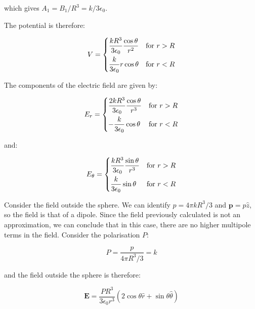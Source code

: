 \documentclass[12pt]{article}
\begin{document}
which gives $A_{1} = B_{1}/R^{3} = k/3\epsilon_{0}$.

The potential is therefore:

\begin{equation}
V =
\begin{dcases}
    \frac{kR^{3}}{3\epsilon_{0}} \frac{\cos{\theta}}{r^{2}} & \text{for } r > R \\
    \frac{k}{3\epsilon_{0}} r \cos{\theta} & \text{for } r < R
\end{dcases}
\end{equation}

The components of the electric field are given by:

\begin{equation}
E_{r} = 
\begin{dcases}
    \frac{2kR^{3}}{3\epsilon_{0}} \frac{\cos{\theta}}{r^{3}} & \text{for } r > R \\
    -\frac{k}{3\epsilon_{0}} \cos{\theta} & \text{for } r < R
\end{dcases}
\end{equation}

and:

\begin{equation}
E_{\theta} =
\begin{dcases}
    \frac{kR^{3}}{3\epsilon_{0}} \frac{\sin{\theta}}{r^{3}} & \text{for } r > R \\
    \frac{k}{3\epsilon_{0}} \sin{\theta} & \text{for } r < R
\end{dcases}
\end{equation}

Consider the field outside the sphere. We can identify $p = 4\pi kR^{3}/3$ and $\mathbf{p} = p \hat{z}$, so the field is that of a dipole. Since the field previously calculated is not an approximation, we can conclude that in this case, there are no higher multipole terms in the field. Consider the polarisation $P$:

\begin{equation}
    P = \frac{p}{4\pi R^{3}/3} = k
\end{equation}

and the field outside the sphere is therefore:

\begin{equation}
    \mathbf{E} = \frac{PR^{3}}{3\epsilon_{0}r^{3}} \left( 2\cos{\theta} \hat{r} + \sin{\theta} \hat{\theta} \right)
\end{equation}
\end{document}
